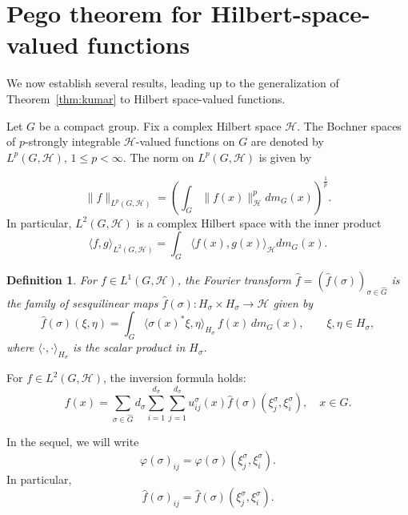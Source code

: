 \documentclass[10pt,a4paper]{amsart}
\newtheorem{definition}[theorem]{Definition}
\begin{document}
\section{Pego theorem for Hilbert-space-valued functions}\label{sec: main results}
We now establish several results, leading up to the generalization of  Theorem~\ref{thm:kumar} to Hilbert space-valued functions.


 Let $G$ be a compact group. Fix a  complex Hilbert space $\mathcal{H}$. The Bochner spaces of $p$-strongly integrable $\mathcal{H}$-valued functions on $G$ are denoted by $L^p(G,\mathcal{H}), \, 1\le p<\infty$. The norm on $L^p(G,\mathcal{H})$ is given by 
 
$$ \|f\|_{L^p(G,\mathcal{H})}=\left(\int_G\|f(x)\|_{\mathcal{H}}^pdm_G(x)\right)^{\frac{1}{p}}.$$
In particular, $L^2(G,\mathcal{H})$ is a complex  Hilbert space with the inner product
$$\langle f,g\rangle_{L^2(G,\mathcal{H})}=\int_G\langle f(x),g(x)\rangle_{\mathcal{H}}dm_G(x).$$
\begin{definition}\cite{Assiamoua1989}
For $f\in L^1(G,\mathcal{H})$, the Fourier transform  $\widehat f=(\widehat f(\sigma))_{\sigma\in\widehat{G}}$
is the family of sesquilinear maps $\widehat f(\sigma):H_\sigma\times H_\sigma\to\mathcal{H}$ given by 
\[
\widehat f(\sigma)(\xi,\eta)=\int_G\langle\sigma(x)^*\xi,\eta\rangle_{H_\sigma}\,f(x)\,dm_G(x),
\qquad\xi,\eta\in H_\sigma,
\]
where $\langle \cdot, \cdot\rangle_{H_\sigma}$ is the scalar product in $H_\sigma$.
\end{definition}

For $f\in L^2(G,\mathcal{H})$, the inversion formula holds:
\begin{equation}\label{eq:inversionformula}
f(x)=\sum_{\sigma\in\widehat{G}}d_\sigma\sum_{i=1}^{d_\sigma}\sum_{j=1}^{d_\sigma}u^\sigma_{ij}(x)\widehat f(\sigma)(\xi_j^\sigma,
\xi_i^\sigma),\quad x\in G.
\end{equation}

In the sequel, we will write
$$\varphi(\sigma)_{ij}=\varphi(\sigma)(\xi_j^\sigma,
\xi_i^\sigma).$$ In particular, 
$$\widehat f(\sigma)_{ij}=\widehat f(\sigma)(\xi_j^\sigma,
\xi_i^\sigma).$$
\end{document}
